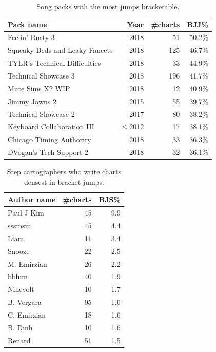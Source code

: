 \documentclass[10pt]{sigplanconf}
\begin{document}
\begin{table}[t]
	\begin{center}
		\small
	\begin{tabular}{l|r|r|r}
		\bf Pack name & \bf Year & \bf \#charts & \bf BJJ\% \\
		\hline
		Feelin' Rusty 3			& 2018	&  51 & 50.2\% \\
		Squeaky Beds and Leaky Faucets	& 2018	& 125 & 46.7\% \\
		TYLR's Technical Difficulties	& 2018	&  33 & 44.9\% \\
		Technical Showcase 3		& 2018	& 196 & 41.7\% \\
		Mute Sims X2 WIP		& 2018	&  12 & 40.9\% \\
		Jimmy Jawns 2			& 2015	&  55 & 39.7\% \\
		Technical Showcase 2		& 2017	&  80 & 38.2\% \\
		Keyboard Collaboration III	& $\le$2012	&  17 & 38.1\% \\
		Chicago Timing Authority	& 2018	&  33 & 36.3\% \\
		DVogan's Tech Support 2		& 2018	&  32 & 36.1\% \\
	\end{tabular}
	\end{center}
	\caption{Song packs with the most jumps bracketable.}
	\label{tab:pack-bjj}
\end{table}

\begin{table}[t]
	\begin{center}
		\small
	\begin{tabular}{l|r|r}
		\bf Author name & \bf \#charts & \bf BJS\% \\
		\hline
		Paul J Kim & 45 & 9.9 \\
		sssmsm & 45 & 4.4 \\
		Liam & 11 & 3.4 \\
		Snooze & 22 & 2.5 \\
		M. Emirzian & 26 & 2.2 \\
		bblum & 40 & 1.9 \\
		Ninevolt & 10 & 1.7 \\
		B. Vergara & 95 & 1.6 \\
		C. Emirzian & 18 & 1.6 \\
		B. Dinh & 10 & 1.6 \\
		Renard & 51 & 1.5 \\
	\end{tabular}
	\end{center}
	\caption{Step cartographers who write charts densest in bracket jumps.}
	\label{tab:author-bjs}
\end{table}
\end{document}
